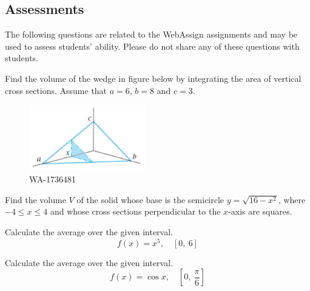 \documentclass[12pt,addpoints, answers, fleqn]{exam}
\begin{document}
\begin{teacher}
\subsection{Assessments}
The following questions are related to the WebAssign assignments and may be used to assess students' ability. Please do not share any of these questions with students.
\begin{questions}	
\question 	%

Find the volume of the wedge in figure below by integrating the area of vertical cross sections. Assume that $a = 6$, $b = 8$ and $c = 3$.

\begin{figure}[htbp] %
   \centering
   \includegraphics[width=2in]{./graphics/1736481.pdf} 
   \caption{WA-1736481}
   \label{fig:1736481}
\end{figure}

\begin{solution}
\end{solution}

\question 	%

Find the volume $V$ of the solid whose base is the semicircle $y = \sqrt{16 - x^2}$, where $-4 \leq x \leq 4$ and whose cross sections perpendicular to the $x$-axis are squares.
 
 \begin{solution}
\end{solution}
\question 	%

Calculate the average over the given interval.
\[
f\left(x\right) = x^5, \quad  \left[0, \ 6 \right]
\]

\begin{solution}
\end{solution}

\question 	%

Calculate the average over the given interval.
\[
f\left(x\right) = \cos x, \quad \left[ 0, \ \frac{\pi}{6} \right]
\]

\begin{solution}
\end{solution}





\end{questions}
\end{teacher}
\end{document}
